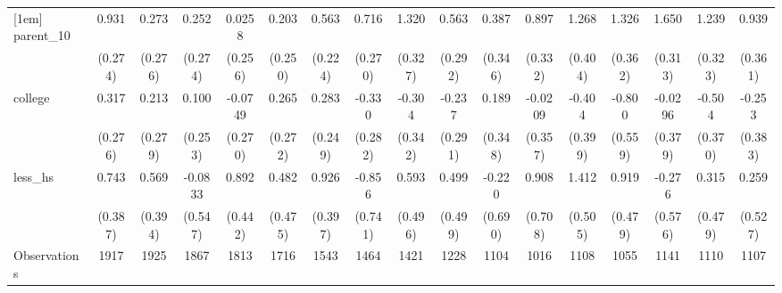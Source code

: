 {\begin{tabular}{l*{16}{c}}
[1em]
parent\_10           &       0.931\sym{***}&       0.273         &       0.252         &      0.0258         &       0.203         &       0.563\sym{*}  &       0.716\sym{**} &       1.320\sym{***}&       0.563         &       0.387         &       0.897\sym{**} &       1.268\sym{**} &       1.326\sym{***}&       1.650\sym{***}&       1.239\sym{***}&       0.939\sym{**} \\
                    &     (0.274)         &     (0.276)         &     (0.274)         &     (0.256)         &     (0.250)         &     (0.224)         &     (0.270)         &     (0.327)         &     (0.292)         &     (0.346)         &     (0.332)         &     (0.404)         &     (0.362)         &     (0.313)         &     (0.323)         &     (0.361)         \\
[1em]
college             &       0.317         &       0.213         &       0.100         &     -0.0749         &       0.265         &       0.283         &      -0.330         &      -0.304         &      -0.237         &       0.189         &     -0.0209         &      -0.404         &      -0.800         &     -0.0296         &      -0.504         &      -0.253         \\
                    &     (0.276)         &     (0.279)         &     (0.253)         &     (0.270)         &     (0.272)         &     (0.249)         &     (0.282)         &     (0.342)         &     (0.291)         &     (0.348)         &     (0.357)         &     (0.399)         &     (0.559)         &     (0.379)         &     (0.370)         &     (0.383)         \\
[1em]
less\_hs             &       0.743         &       0.569         &     -0.0833         &       0.892\sym{*}  &       0.482         &       0.926\sym{*}  &      -0.856         &       0.593         &       0.499         &      -0.220         &       0.908         &       1.412\sym{**} &       0.919         &      -0.276         &       0.315         &       0.259         \\
                    &     (0.387)         &     (0.394)         &     (0.547)         &     (0.442)         &     (0.475)         &     (0.397)         &     (0.741)         &     (0.496)         &     (0.499)         &     (0.690)         &     (0.708)         &     (0.505)         &     (0.479)         &     (0.576)         &     (0.479)         &     (0.527)         \\
\hline
Observations        &        1917         &        1925         &        1867         &        1813         &        1716         &        1543         &        1464         &        1421         &        1228         &        1104         &        1016         &        1108         &        1055         &        1141         &        1110         &        1107         \\

\end{tabular}}
